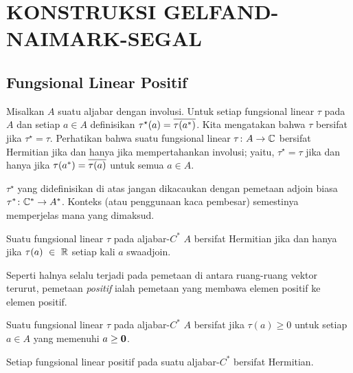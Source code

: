 \chapter{KONSTRUKSI GELFAND-NAIMARK-SEGAL}\label{gelfand_naimark_segal}

\section{Fungsional Linear Positif}
\begin{defn} Misalkan $A$ suatu aljabar dengan involusi. Untuk setiap fungsional linear $\tau$ pada
$A$ dan setiap $a \in A$ definisikan
$\tau^\star(a) = \overline{\tau(a^*)}$.  Kita mengatakan bahwa $\tau$ bersifat
 jika $\tau^\star = \tau$.  Perhatikan bahwa suatu fungsional linear $\tau\colon A
\rightarrow \mathbb{C}$ bersifat Hermitian jika dan hanya jika mempertahankan involusi; yaitu, $\tau^\star =
\tau$ jika dan hanya jika $\tau(a^*) = \overline{\tau(a)}$ untuk semua $a \in A$.
\end{defn}

\begin{cau} $\tau^\star$ yang didefinisikan di atas jangan dikacaukan dengan pemetaan adjoin
biasa $\tau^*\colon \mathbb{C}^* \rightarrow A^*$. Konteks (atau penggunaan kaca pembesar) semestinya
memperjelas mana yang dimaksud.
\end{cau}

\begin{prop} Suatu fungsional linear $\tau$ pada aljabar-$C^*$ $A$ bersifat Hermitian jika dan hanya jika
$\tau(a)~\in~\mathbb{R}$ setiap kali $a$ swaadjoin.
\end{prop}

Seperti halnya selalu terjadi pada pemetaan di antara ruang-ruang vektor terurut, pemetaan
\emph{positif} ialah pemetaan yang membawa elemen positif ke elemen positif.

\begin{defn} Suatu fungsional linear $\tau$ pada aljabar-$C^*$ $A$ bersifat
 jika $\tau(a) \ge 0$ untuk setiap $a \in A$ yang memenuhi $a \ge \mathbf{0}$.
\end{defn}


\begin{prop} Setiap fungsional linear positif pada suatu aljabar-$C^*$ bersifat Hermitian.
\end{prop}

